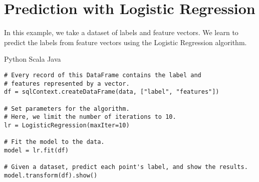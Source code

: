 \section*{Prediction with Logistic Regression}
In this example, we take a dataset of labels and feature vectors. We learn to predict the labels from feature vectors using the Logistic Regression algorithm.

Python
Scala
Java
\begin{verbatim}
# Every record of this DataFrame contains the label and
# features represented by a vector.
df = sqlContext.createDataFrame(data, ["label", "features"])

# Set parameters for the algorithm.
# Here, we limit the number of iterations to 10.
lr = LogisticRegression(maxIter=10)

# Fit the model to the data.
model = lr.fit(df)

# Given a dataset, predict each point's label, and show the results.
model.transform(df).show()
\end{verbatim}


